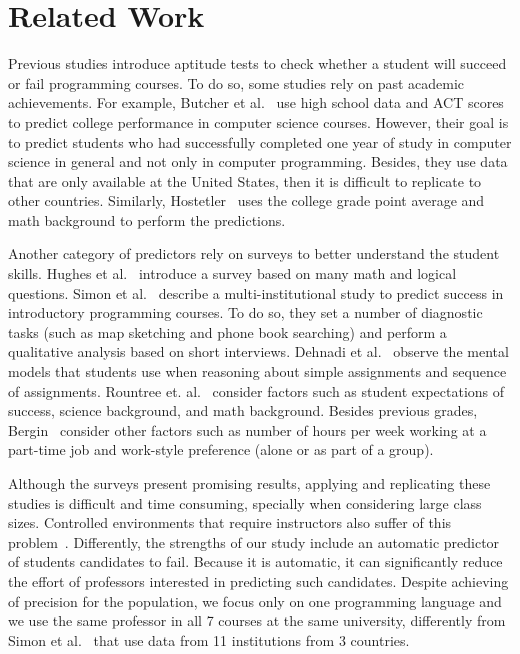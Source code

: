 \section{Related Work}

\label{sec:related}

Previous studies introduce aptitude tests to check whether a student will succeed or fail programming courses. To do so, some studies rely on past academic achievements. For example, Butcher et al.~\cite{butcher-predictor-high-school-1985} use high school data and ACT scores to predict college performance in computer science courses. However, their goal is to predict students who had successfully completed one year of study in computer science in general and not only in computer programming. Besides, they use data that are only available at the United States, then it is difficult to replicate to other countries. Similarly, Hostetler~\cite{hostetler-aptitude-1983} uses the college grade point average and math background to perform the predictions.

Another category of predictors rely on surveys to better understand the student skills. Hughes et al.~\cite{ibm-aptitude-test} introduce a survey based on many math and logical questions. Simon et al.~\cite{simon-predictors-ace2006} describe a multi-institutional study to predict success in introductory programming courses. To do so, they set a number of diagnostic tasks (such as map sketching and phone book searching) and perform a qualitative analysis based on short interviews. Dehnadi et al.~\cite{camel-2006} observe the mental models that students use when reasoning about simple assignments and sequence of assignments. Rountree et. al.~\cite{nathan-2004} consider factors such as student expectations of success, science background, and math background. Besides previous grades, Bergin~\cite{susan-sigce2005} consider other factors such as number of hours per week working at a part-time job and work-style preference (alone or as part of a group).

Although the surveys present promising results, applying and replicating these studies is difficult and time consuming, specially when considering large class sizes. Controlled environments that require instructors also suffer of this problem~\cite{barker-predictor-83}. Differently, the strengths of our study include an automatic predictor of students candidates to fail. Because it is automatic, it can significantly reduce the effort of professors interested in predicting such candidates. Despite achieving \higherPrecision of precision for the population, we focus only on one programming language and we use the same professor in all 7 courses at the same university, differently from Simon et al.~\cite{simon-predictors-ace2006} that use data from 11 institutions from 3 countries.


